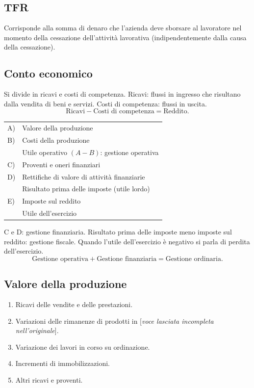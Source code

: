 \documentclass[11pt,a4paper]{article}
\newcommand{\orig}[1]{\clearpage}
\begin{document}
\subsection*{TFR}
Corrisponde alla somma di denaro che l'azienda deve sborsare al lavoratore nel momento della cessazione dell'attività lavorativa (indipendentemente dalla causa della cessazione).
\orig{27}\subsection*{Conto economico}
Si divide in ricavi e costi di competenza.
Ricavi: flussi in ingresso che risultano dalla vendita di beni e servizi. Costi di competenza: flussi in uscita.
\[\text{Ricavi}-\text{Costi di competenza}=\text{Reddito}.\]
\begin{center}\begin{tabular}{lp{.73\linewidth}}
A)&Valore della produzione\\
B)&Costi della produzione\\\hline
&Utile operativo $(A-B)$: gestione operativa\\
C)&Proventi e oneri finanziari\\
D)&Rettifiche di valore di attività finanziarie\\\hline
&Risultato prima delle imposte (utile lordo)\\
E)&Imposte sul reddito\\\hline
&Utile dell'esercizio
\end{tabular}\end{center}
C e D: gestione finanziaria. Risultato prima delle imposte meno imposte sul reddito: gestione fiscale.
Quando l'utile dell'esercizio è negativo si parla di perdita dell'esercizio.
\[\text{Gestione operativa}+\text{Gestione finanziaria}=\text{Gestione ordinaria}.\]
\orig{28}\subsection*{Valore della produzione}
\begin{enumerate}
\item Ricavi delle vendite e delle prestazioni.
\item Variazioni delle rimanenze di prodotti in [\textit{voce lasciata incompleta nell'originale}].
\item Variazione dei lavori in corso su ordinazione.
\item Incrementi di immobilizzazioni.
\item Altri ricavi e proventi.
\end{enumerate}
\end{document}
